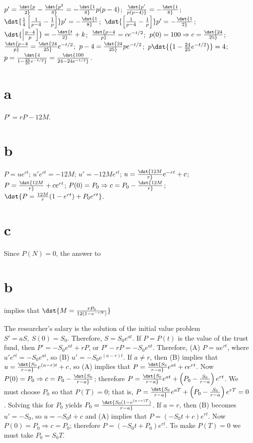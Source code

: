 \documentclass[dvips]{book}
\renewcommand{\exer}[1]{\par\medskip\;\noindent{\color{red}\bf #1.}}
\numberwithin{example}{section}
\numberwithin{equation}{section}
\numberwithin{theorem}{section}
\numberwithin{table}{section}
\numberwithin{figure}{section}
\begin{document}
\exer{4.1.20}
$p'=\dst{p\over2}-\dst{p^2\over8}=-\dst{1\over8}p(p-4)$;\,
$\dst{p'\over p(p-4)}=-\dst{1\over8}$;\, $\dst{{1\over4}\left[
{1\over p-4}-{1\over p}\right]}p'=-\dst{1\over8}$;\,
 $\dst{\left[
{1\over p-4}-{1\over p}\right]}p'=-\dst{1\over2}$;\,
$\dst{\left|p-4\over p\right]}=-\dst{t\over2}+k$;\,
$\dst{p-4\over p}=ce^{-t/2}$;\, $p(0)=100\Rightarrow
c=\dst{24\over25}$;\, $\dst{p-4\over p}=\dst{24\over25}e^{-t/2}$;\,
$p-4=\dst{24\over25}pe^{-t/2}$;\,
$p\dst{\left(1-{24\over25}e^{-t/2}\right)}=4$;\,
$p=\dst{4\over1-{24\over25}e^{-t/2}}=\dst{100\over24-24e^{-t/2}}$.


\exer{4.1.22}
\part{a}$P'=rP-12M$.

\part{b}
$P=ue^{rt}$; $u'e^{rt}=-12M$; $u'=-12Me^{rt}$;
$u=\dst{12M\over r}e^{-rt}+c$; $P=\dst{12M\over r}+ce^{rt}$;
$P(0)=P_0\Rightarrow c=P_0-\dst{12M\over r}$;
$\dst{P={12M\over r}(1-e^{rt})+P_0e^{rt}}$.

\part{c} Since $P(N)=0$, the answer to \part{b} implies that
 $\dst{M={rP_0\over 12(1-e^{-rN})}}$


\exer{4.1.24}
The researcher's salary is the solution of the initial value problem
$S'=aS,\ S(0)=S_0$. Therefore, $S=S_0e^{at}$. If $P=P(t)$ is the value
of the trust fund, then $P'=-S_0e^{at}+rP$, or $P'-rP=-S_0e^{at}$.
Therefore, (A) $P=ue^{rt}$, where $u'e^{rt}=-S_0e^{at}$,
 so (B) $u'=-S_0e^{(a-r)t}$. If $a\ne r$, then (B) implies that
$u=\dst{S_0\over r-a}e^{(a-r)t}+c$, so (A) implies that
$P=\dst{S_0\over r-a}e^{at}+ce^{rt}$. Now $P(0)=P_0\Rightarrow
c=P_0-\dst{S_0\over r-a}$; therefore
$P=\dst{S_0\over r-a}e^{at}+\left(P_0-{S_0\over r-a}\right)e^{rt}$.
We must choose $P_0$ so that $P(T)=0$; that is,
$P=\dst{S_0\over r-a}e^{aT}+\left(P_0-{S_0\over r-a}\right)e^{rT}=0$.
Solving this for $P_0$ yields
$P_0=\dst{S_0(1-e^{(a-r)T})\over r-a}$.
If $a=r$, then (B) becomes
$u'=-S_0$, so $u=-S_0t+c$ and (A) implies that
$P=(-S_0t+c)e^{rt}$. Now $P(0)=P_0\Rightarrow
c=P_0$; therefore
$P=(-S_0t+P_0)e^{rt}$.
To make $P(T)=0$ we must take $P_0=S_0T$.
\end{document}
